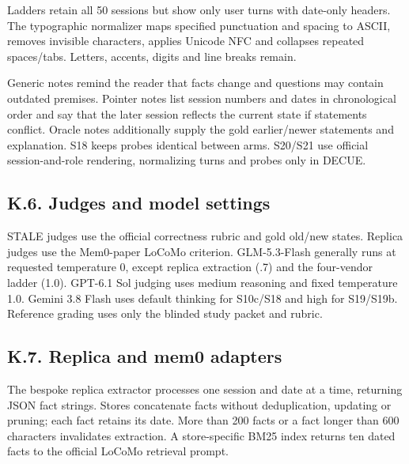\documentclass[11pt]{article}
\begin{document}
Ladders retain all 50 sessions but show only user turns with date-only headers. The typographic normalizer maps specified punctuation and spacing to ASCII, removes invisible characters, applies Unicode NFC and collapses repeated spaces/\allowbreak{}tabs. Letters, accents, digits and line breaks remain.

Generic notes remind the reader that facts change and questions may contain outdated premises. Pointer notes list session numbers and dates in chronological order and say that the later session reflects the current state if statements conflict. Oracle notes additionally supply the gold earlier/\allowbreak{}newer statements and explanation. S18 keeps probes identical between arms. S20/\allowbreak{}S21 use official session-and-role rendering, normalizing turns and probes only in DECUE.

\label{appendix-k7}

\label{appendix-k6}

\subsection{K.6. Judges and model settings}\label{k.6.-judges-and-model-settings}

STALE judges use the official correctness rubric and gold old/\allowbreak{}new states. Replica judges use the Mem0-paper LoCoMo criterion. GLM-5.3-Flash generally runs at requested temperature 0, except replica extraction (.7) and the four-vendor ladder (1.0). GPT-6.1 Sol judging uses medium reasoning and fixed temperature 1.0. Gemini 3.8 Flash uses default thinking for S10c/\allowbreak{}S18 and high for S19/\allowbreak{}S19b. Reference grading uses only the blinded study packet and rubric.

\label{appendix-k8}

\subsection{K.7. Replica and mem0 adapters}\label{k.7.-replica-and-mem0-adapters}

The bespoke replica extractor processes one session and date at a time, returning JSON fact strings. Stores concatenate facts without deduplication, updating or pruning; each fact retains its date. More than 200 facts or a fact longer than 600 characters invalidates extraction. A store-specific BM25 index returns ten dated facts to the official LoCoMo retrieval prompt.
\end{document}
